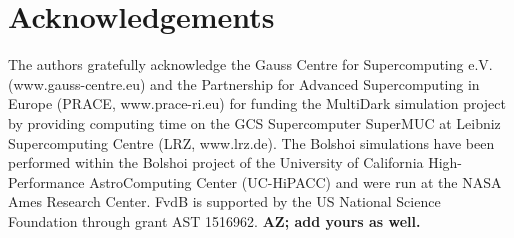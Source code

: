 \documentclass[usenatbib,usegraphicx,letterpaper]{mn2e}
\begin{document}
\section{Acknowledgements}
\label{section:acknowledgements}

The authors gratefully acknowledge the Gauss Centre for Supercomputing
e.V. (www.gauss-centre.eu) and the Partnership for Advanced
Supercomputing in Europe (PRACE, www.prace-ri.eu) for funding the
MultiDark simulation project by providing computing time on the GCS
Supercomputer SuperMUC at Leibniz Supercomputing Centre (LRZ,
www.lrz.de). The Bolshoi simulations have been performed within the
Bolshoi project of the University of California High-Performance
AstroComputing Center (UC-HiPACC) and were run at the NASA Ames
Research Center. FvdB is supported by the US National Science
Foundation through grant AST 1516962. {\bf AZ; add yours as well.}





\end{document}
